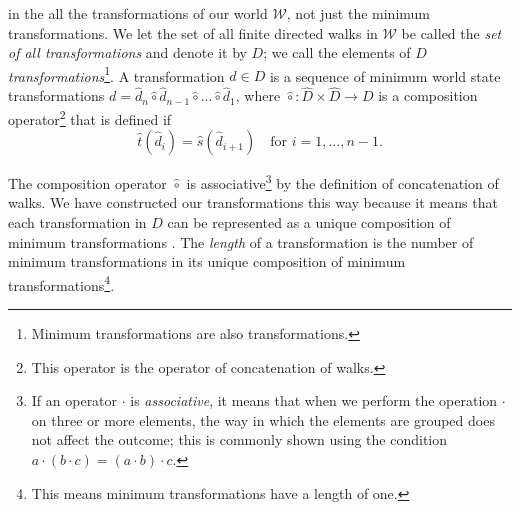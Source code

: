  in the all the transformations of our world $\mathscr{W}$, not just the minimum transformations.
We let the set of all finite directed walks in $\mathscr{W}$ be called the \emph{set of all transformations} and denote it by $D$; we call the elements of $D$ \emph{transformations}\footnote{Minimum transformations are also transformations.}.
A transformation $d \in D$ is a sequence of minimum world state transformations $d = \hat{d}_{n} \hat{\circ} \hat{d}_{n-1} \hat{\circ} ... \hat{\circ} \hat{d}_{1}$, where $\hat{\circ}: \hat{D} \times \hat{D} \to D$ is a composition operator\footnote{This operator is the operator of concatenation of walks.} that is defined if 
\begin{equation}
    \hat{t}(\hat{d}_{i}) = \hat{s}(\hat{d}_{i+1}) \quad \text{for $i = 1, ..., n-1$.}
\end{equation}

The composition operator $\hat{\circ}$ is associative\footnote{If an operator $\cdot$ is \emph{associative}, it means that when we perform the operation $\cdot$ on three or more elements, the way in which the elements are grouped does not affect the outcome; this is commonly shown using the condition $a \cdot (b \cdot c) = (a \cdot b) \cdot c$.} by the definition of concatenation of walks.
We have constructed our transformations this way because it means that each transformation in $D$ can be represented as a unique composition of minimum transformations .
The \emph{length} of a transformation is the number of minimum transformations in its unique composition of minimum transformations\footnote{This means minimum transformations have a length of one.}.

